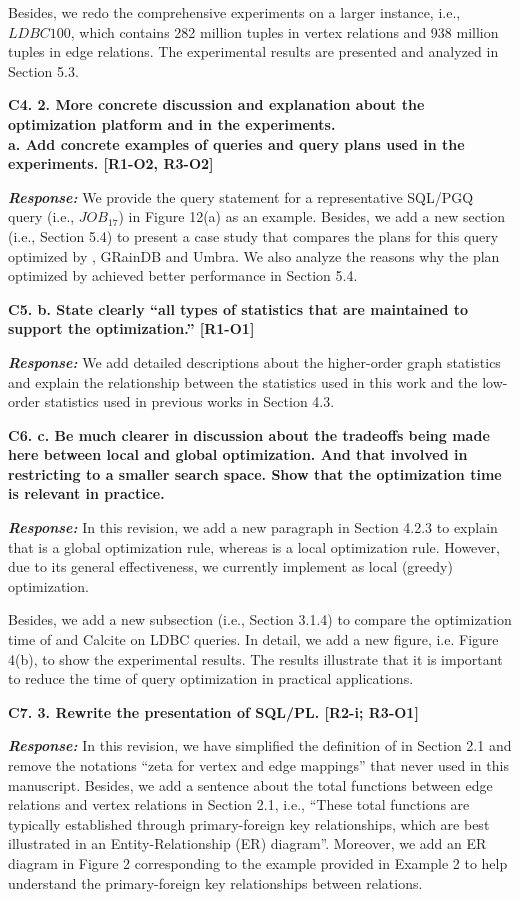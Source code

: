 Besides, we redo the comprehensive experiments on a larger instance, i.e., $LDBC100$, which contains 282 million tuples in vertex relations and 938 million tuples in edge relations.
The experimental results are presented and analyzed in Section 5.3.


\textbf{
C4. 2. More concrete discussion and explanation about the optimization platform and in the experiments. \\
a. Add concrete examples of queries and query plans used in the experiments. [R1-O2, R3-O2]
}

\textbf{\textit{Response: }}
We provide the query statement for a representative SQL/PGQ query (i.e., $JOB_{17}$) in Figure 12(a) as an example.
Besides, we add a new section (i.e., Section 5.4) to present a case study that compares the plans for this query optimized by \name, GRainDB and Umbra.
We also analyze the reasons why the plan optimized by \name achieved better performance in Section 5.4.


\textbf{
C5. b. State clearly “all types of statistics that are maintained to support the optimization.” [R1-O1]}

\textbf{\textit{Response: }}
We add detailed descriptions about the higher-order graph statistics and explain the relationship between the statistics used in this work and the low-order statistics used in previous works in Section 4.3.


\textbf{
C6. c. Be much clearer in discussion about the tradeoffs being made here between local and global optimization. And that involved in restricting to a smaller search space. Show that the optimization time is relevant in practice.}

\textbf{\textit{Response: }}
In this revision, we add a new paragraph in Section 4.2.3 to explain that \filterrule is a global optimization rule, whereas \fusionrule is a local optimization rule. However, due to its general effectiveness, we currently implement \filterrule as local (greedy) optimization.

Besides, we add a new subsection (i.e., Section 3.1.4) to compare the optimization time of \name and Calcite on LDBC queries.
In detail, we add a new figure, i.e. Figure 4(b), to show the experimental results.
The results illustrate that it is important to reduce the time of query optimization in practical applications.


\textbf{
C7. 3. Rewrite the presentation of SQL/PL. [R2-i; R3-O1]
}

\textbf{\textit{Response: }}
In this revision, we have simplified the definition of \rgmapping in Section 2.1 and remove the notations ``zeta for vertex and edge mappings'' that never used in this manuscript.
Besides, we add a sentence about the total functions between edge relations and vertex relations in Section 2.1, i.e., ``These total functions are typically established through primary-foreign key relationships, which are best illustrated in an Entity-Relationship (ER) diagram''.
Moreover, we add an ER diagram in Figure 2 corresponding to the example provided in Example 2 to help understand the primary-foreign key relationships between relations.
